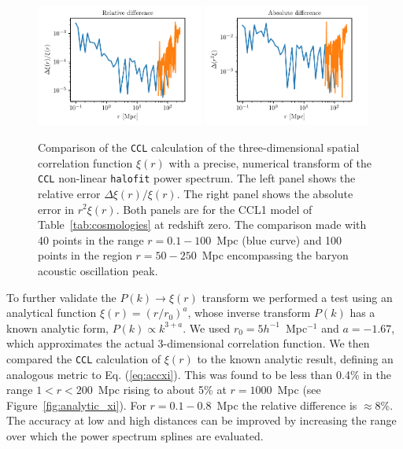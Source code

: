 \documentclass[\docopts]{\docclass}
\newcommand{\ccl}{{\tt CCL}\xspace}
\newcommand{\halofit}{{\tt halofit}\xspace}
\begin{document}
\begin{figure}
\centering
\includegraphics[width=0.49\textwidth]{benchmark_xi_rel}
\includegraphics[width=0.49\textwidth]{benchmark_xi_abs} 
\caption{Comparison of the \ccl calculation of the three-dimensional spatial correlation function $\xi(r)$ with a precise, numerical transform of the \ccl non-linear \halofit power spectrum. The left panel shows the relative error $\Delta \xi(r) / \xi(r)$. The right panel shows the absolute error in $r^2 \xi(r)$. Both panels are for the CCL1 model of Table~\ref{tab:cosmologies} at redshift zero. The comparison made with 40 points in the range $r = 0.1 - 100$~Mpc (blue curve) and 100 points in the region $r = 50 - 250$~Mpc encompassing the baryon acoustic oscillation peak.}
\label{fig:benchmark_xi}
\end{figure}

To further validate the $P(k) \to \xi(r)$ transform we performed a test using an analytical function $\xi(r) = (r / r_0)^a$, whose inverse transform $P(k)$ has a known analytic form, $P(k) \propto k^{3+a}$. We used $r_0 = 5 h^{-1}$~Mpc$^{-1}$ and $a = -1.67$, which approximates the actual 3-dimensional correlation function.  We then compared the \ccl calculation of $\xi(r)$ to the known analytic result, defining an analogous metric to Eq. (\ref{eq:accxi}). This was found to be less than 0.4\% in the range $1 < r < 200$~Mpc rising to about 5\% at $r = 1000$~Mpc (see Figure~\ref{fig:analytic_xi}). For $r=0.1-0.8$~Mpc the relative difference is $\approx$8\%. The accuracy at low and high distances can be improved by increasing the range over which the power spectrum splines are evaluated. 
\end{document}
